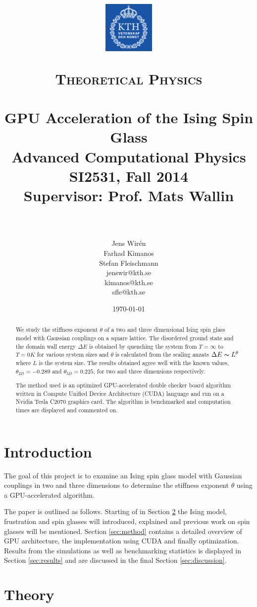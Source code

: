 \documentclass[paper=a4, fontsize=11pt]{scrartcl} %
\title{
\vspace{-2.5cm}
\begin{center}
\includegraphics[width=2.5cm]{logo-kth.png}\\[-1mm]
\hspace{-3mm}
\end{center}
\normalfont \normalsize
\textsc{Theoretical Physics} \\ [25pt] %
\horrule{0.5pt} \\[0.4cm] %
\huge GPU Acceleration of the Ising Spin Glass \\ %
\Large Advanced Computational Physics\\ %
\Large SI2531, Fall 2014\\ %
\Large Supervisor: Prof. Mats Wallin \\ %
\horrule{2pt} \\[0.5cm] %
}
\author{Jens Wir\'{e}n \\
Farhad Kimanos \\
Stefan Fleischmann \\
\normalsize jenswir@kth.se \\
\normalsize kimanos@kth.se \\
\normalsize sfle@kth.se} %
\date{\normalsize\today} %
\numberwithin{equation}{section} %
\numberwithin{figure}{section} %
\numberwithin{table}{section} %
\begin{document}
\maketitle %


\begin{abstract}
We study the stiffness exponent $\theta$ of a two and three dimensional Ising spin glass model with Gaussian couplings on a square lattice. The disordered ground state and the domain wall energy $\Delta E$ is obtained by quenching the system from $T=\infty$ to $T=0 K$ for various system sizes and $\theta$ is calculated from the scaling anzats $\Delta E \thicksim L^\theta$ where $L$ is the system size. The results obtained agree well with the known values, $\theta_{2D}=-0.289$ and $\theta_{3D}=0.225$, for two and three dimensions respectively.

The method used is an optimized GPU-accelerated double checker board algorithm written in Compute Unified Device Architecture (CUDA) language and run on a Nvidia Tesla C2070 graphics card. The algorithm is benchmarked and computation times are displayed and commented on.
\end{abstract}

\pagebreak

\tableofcontents

\section{Introduction}

The goal of this project is to examine an Ising spin glass model with Gaussian couplings in two and three dimensions to determine the stiffness exponent $\theta$ using a GPU-accelerated algorithm. 

The paper is outlined as follows. Starting of in Section \ref{sec:theory} the Ising model, frustration and spin glasses will introduced, explained and previous work on spin glasses will be mentioned. Section \ref{sec:method} contains a detailed overview of GPU architecture, the implementation using CUDA and finally optimization. Results from the simulations as well as benchmarking statistics is displayed in Section \ref{sec:results} and are discussed in the final Section \ref{sec:discussion}.

\section{Theory}
\label{sec:theory}
\end{document}
